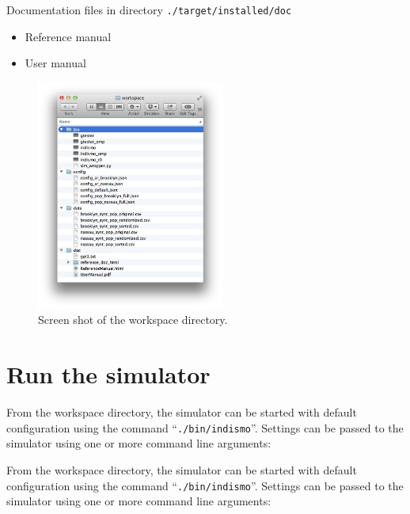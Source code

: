 \begin{compactitem}
\begin{itemize}
        \end{itemize}
    \item Documentation files
      in directory \texttt{./target/installed/doc}
      	\begin{itemize}
        		\item Reference manual
        		\item User manual
        \end{itemize}
\end{compactitem}


\begin{figure}[h]
	\begin{center}
		\includegraphics[width=0.55\textwidth]{images/screen_shot_workspace_dir.pdf}  
	\end{center}
	\caption{Screen shot of the workspace directory.}
	\label{fig:workspace}
\end{figure}



\section{Run the simulator}


From the workspace directory, the simulator can be started with default configuration using the command \mbox{``\texttt{./bin/indismo}''}. Settings can be passed to the simulator using one or more command line arguments:

From the workspace directory, the simulator can be started with default configuration using the command \mbox{``\texttt{./bin/indismo}''}. Settings can be passed to the simulator using one or more command line arguments:

